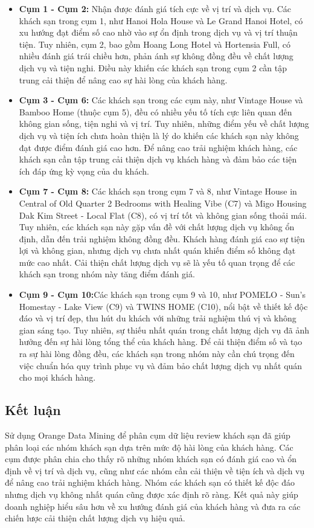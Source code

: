 \begin{itemize}
    \item \textbf{Cụm 1 - Cụm 2:} Nhận được đánh giá tích cực về vị trí và dịch vụ. Các khách sạn trong cụm 1, như Hanoi Hola House và Le Grand Hanoi Hotel, có xu hướng đạt điểm số cao nhờ vào sự ổn định trong dịch vụ và vị trí thuận tiện. Tuy nhiên, cụm 2, bao gồm Hoang Long Hotel và Hortensia Full, có nhiều đánh giá trái chiều hơn, phản ánh sự không đồng đều về chất lượng dịch vụ và tiện nghi. Điều này khiến các khách sạn trong cụm 2 cần tập trung cải thiện để nâng cao sự hài lòng của khách hàng.

    \item \textbf{Cụm 3 - Cụm 6:} Các khách sạn trong các cụm này, như Vintage House và Bamboo Home (thuộc cụm 5), đều có nhiều yếu tố tích cực liên quan đến không gian sống, tiện nghi và vị trí. Tuy nhiên, những điểm yếu về chất lượng dịch vụ và tiện ích chưa hoàn thiện là lý do khiến các khách sạn này không đạt được điểm đánh giá cao hơn. Để nâng cao trải nghiệm khách hàng, các khách sạn cần tập trung cải thiện dịch vụ khách hàng và đảm bảo các tiện ích đáp ứng kỳ vọng của du khách.

    \item \textbf{Cụm 7 - Cụm 8:} Các khách sạn trong cụm 7 và 8, như Vintage House in Central of Old Quarter 2 Bedrooms with Healing Vibe (C7) và Migo Housing Dak Kim Street - Local Flat (C8), có vị trí tốt và không gian sống thoải mái. Tuy nhiên, các khách sạn này gặp vấn đề với chất lượng dịch vụ không ổn định, dẫn đến trải nghiệm không đồng đều. Khách hàng đánh giá cao sự tiện lợi và không gian, nhưng dịch vụ chưa nhất quán khiến điểm số không đạt mức cao nhất. Cải thiện chất lượng dịch vụ sẽ là yếu tố quan trọng để các khách sạn trong nhóm này tăng điểm đánh giá.

    \item \textbf{Cụm 9 - Cụm 10:}Các khách sạn trong cụm 9 và 10, như POMELO - Sun's Homestay - Lake View (C9) và TWINS HOME (C10), nổi bật về thiết kế độc đáo và vị trí đẹp, thu hút du khách với những trải nghiệm thú vị và không gian sáng tạo. Tuy nhiên, sự thiếu nhất quán trong chất lượng dịch vụ đã ảnh hưởng đến sự hài lòng tổng thể của khách hàng. Để cải thiện điểm số và tạo ra sự hài lòng đồng đều, các khách sạn trong nhóm này cần chú trọng đến việc chuẩn hóa quy trình phục vụ và đảm bảo chất lượng dịch vụ nhất quán cho mọi khách hàng.
\end{itemize}

\subsection{Kết luận}
Sử dụng Orange Data Mining để phân cụm dữ liệu review khách sạn đã giúp phân loại các nhóm khách sạn dựa trên mức độ hài lòng của khách hàng. Các cụm được phân chia cho thấy rõ những nhóm khách sạn có đánh giá cao và ổn định về vị trí và dịch vụ, cũng như các nhóm cần cải thiện về tiện ích và dịch vụ để nâng cao trải nghiệm khách hàng. Nhóm các khách sạn có thiết kế độc đáo nhưng dịch vụ không nhất quán cũng được xác định rõ ràng. Kết quả này giúp doanh nghiệp hiểu sâu hơn về xu hướng đánh giá của khách hàng và đưa ra các chiến lược cải thiện chất lượng dịch vụ hiệu quả.

